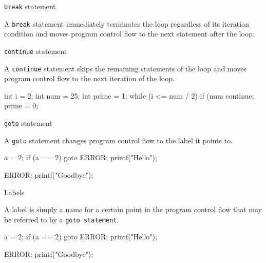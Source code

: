 \documentclass[compress]{beamer}
\begin{document}
\begin{slide}
	\begin{block}{\texttt{break} statement}

	A \texttt{break} statement immediately terminates the loop regardless of its iteration condition and moves program control flow to the next statement after the loop.


	\end{block}
\end{slide}

\begin{slide}
	\begin{block}{\texttt{continue} statement}

	A \texttt{continue} statement skips the remaining statements of the loop and moves program control flow to the next iteration of the loop.

	\begin{terminal}
	int i = 2;
	int num = 25;
	int prime = 1;
	while (i <= num / 2) {
	    if (num %
	        continue;
	    prime = 0;
	}
	\end{terminal}

	\end{block}
\end{slide}

\begin{slide}
	\begin{block}{\texttt{goto} statement}

	A \texttt{goto} statement changes program control flow to the label it points to.
	\begin{terminal}
	    a = 2;
	    if (a == 2)
	        goto ERROR;
	    printf("Hello");

	ERROR:
	    printf("Goodbye");
	\end{terminal}

	\end{block}
\end{slide}

\begin{slide}
	\begin{block}{Labels}

	A label is simply a name for a certain point in the program control flow that may be referred to by a \texttt{goto statement}.

	\begin{terminal}
	    a = 2;
	    if (a == 2)
	        goto ERROR;
	    printf("Hello");

	ERROR:
	    printf("Goodbye");
	\end{terminal}

	\end{block}
\end{slide}
\end{document}
